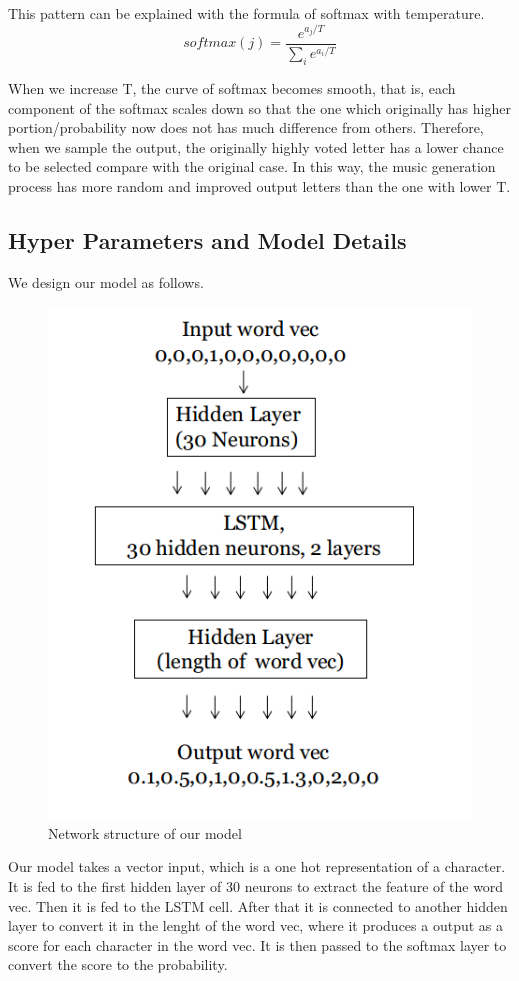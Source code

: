 \documentclass{article}
\begin{document}
This pattern can be explained with the formula of softmax with temperature. 
\begin{equation}
softmax(j) = \frac{e^{a_j/T}}{\sum_{i} e^{a_i/T}}
\end{equation}

When we increase T, the curve of softmax becomes smooth, that is, each component of the softmax scales down so that the one which originally has higher portion/probability now does not has much difference from others. Therefore, when we sample the output, the originally highly voted letter has a lower chance to be selected compare with the original case. In this way, the music generation process has more random and improved output letters than the one with lower T. 


\subsection{Hyper Parameters and Model Details}
We design our model as follows.
\begin{figure}[h]
\centering
\includegraphics[scale=0.5]{pics/model.png}
\caption{Network structure of our model}
\end{figure}
Our model takes a vector input, which is a one hot representation of a character. It is fed to the first hidden layer of 30 neurons to extract the feature of the word vec. Then it is fed to the LSTM cell. After that it is connected to another hidden layer to convert it in the lenght of the word vec, where it produces a output as a score for each character in the word vec. It is then passed to the softmax layer to convert the score to the probability.
\end{document}
